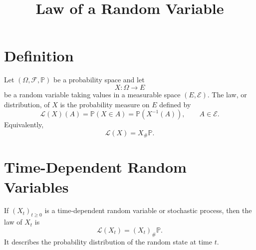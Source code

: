 \documentclass[11pt]{article}
\title{Law of a Random Variable}
\author{}
\date{}
\begin{document}
\maketitle

\section*{Definition}

Let $(\Omega,\mathcal F,\mathbb P)$ be a probability space and let
\[
X:\Omega\to E
\]
be a random variable taking values in a measurable space $(E,\mathcal E)$.
The law, or distribution, of $X$ is the probability measure on $E$ defined by
\[
\mathcal L(X)(A)
=
\mathbb P(X\in A)
=
\mathbb P(X^{-1}(A)),
\qquad A\in\mathcal E.
\]
Equivalently,
\[
\mathcal L(X)=X_\#\mathbb P.
\]

\section*{Time-Dependent Random Variables}

If $(X_t)_{t\ge 0}$ is a time-dependent random variable or stochastic process,
then the law of $X_t$ is
\[
\mathcal L(X_t)=(X_t)_\#\mathbb P.
\]
It describes the probability distribution of the random state at time $t$.
\end{document}
